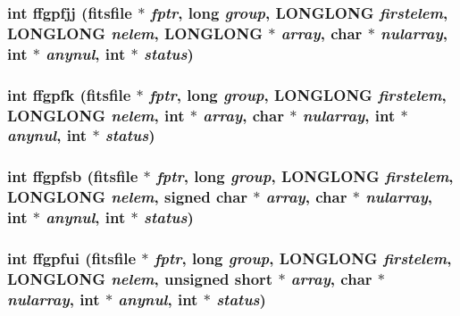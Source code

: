 \subsubsection{\setlength{\rightskip}{0pt plus 5cm}int ffgpfjj (\bf{fitsfile} $\ast$ {\em fptr}, long {\em group}, \bf{LONGLONG} {\em firstelem}, \bf{LONGLONG} {\em nelem}, \bf{LONGLONG} $\ast$ {\em array}, char $\ast$ {\em nularray}, int $\ast$ {\em anynul}, int $\ast$ {\em status})}\label{test_2roimasker_2fitsio_8h_b8dd1aed0cf184dd27347a3ad89bd888}


\subsubsection{\setlength{\rightskip}{0pt plus 5cm}int ffgpfk (\bf{fitsfile} $\ast$ {\em fptr}, long {\em group}, \bf{LONGLONG} {\em firstelem}, \bf{LONGLONG} {\em nelem}, int $\ast$ {\em array}, char $\ast$ {\em nularray}, int $\ast$ {\em anynul}, int $\ast$ {\em status})}\label{test_2roimasker_2fitsio_8h_39fded4193b93f54f993961de406751f}


\subsubsection{\setlength{\rightskip}{0pt plus 5cm}int ffgpfsb (\bf{fitsfile} $\ast$ {\em fptr}, long {\em group}, \bf{LONGLONG} {\em firstelem}, \bf{LONGLONG} {\em nelem}, signed char $\ast$ {\em array}, char $\ast$ {\em nularray}, int $\ast$ {\em anynul}, int $\ast$ {\em status})}\label{test_2roimasker_2fitsio_8h_d9472db2fdb501fccf5c65359329a9d6}


\subsubsection{\setlength{\rightskip}{0pt plus 5cm}int ffgpfui (\bf{fitsfile} $\ast$ {\em fptr}, long {\em group}, \bf{LONGLONG} {\em firstelem}, \bf{LONGLONG} {\em nelem}, unsigned short $\ast$ {\em array}, char $\ast$ {\em nularray}, int $\ast$ {\em anynul}, int $\ast$ {\em status})}\label{test_2roimasker_2fitsio_8h_37540a1aeebbe1a4d6a20df96204a615}


